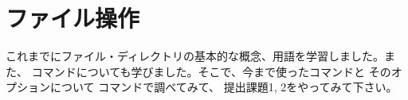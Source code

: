 \documentclass[platex]{jsarticle}
\begin{document}

%

\section{ファイル操作}

 これまでにファイル・ディレクトリの基本的な概念、用語を学習しました。また、
  コマンドについても学びました。そこで、今まで使ったコマンドと
 そのオプションについて  コマンドで調べてみて、
 提出課題1, 2をやってみて下さい。
\end{document}
